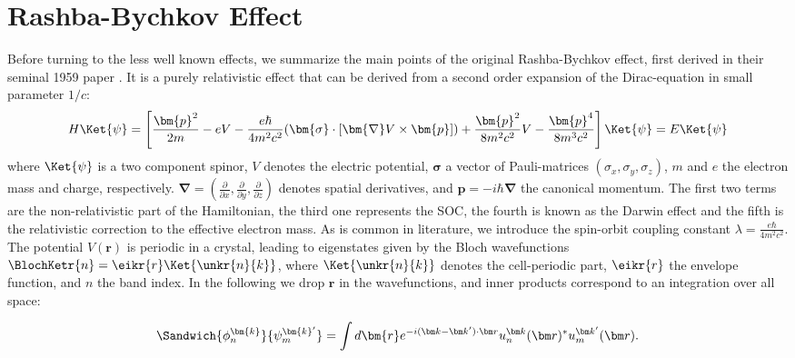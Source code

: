 \section{Rashba-Bychkov Effect \label{sec:Rashba_relativistic}}
Before turning to the less well known effects, we summarize the main points of the original Rashba-Bychkov effect, first derived in their seminal 1959 paper \cite{Rashba1959SymmetryAr}.
It is a purely relativistic effect that can be derived from a second order expansion of the Dirac-equation in small parameter $1/c$:
\begin{equation}
	\label{eq:Rashba_dirac}
	H \Ket{\psi} = \left[\frac{\bm{p}^2}{2m} - e V - \frac{e \hbar}{4m^2c^2}(\bm{\sigma}\cdot[\bm{\nabla}V \times \bm{p}]) + \frac{\bm{p}^2}{8m^2c^2} V - \frac{\bm{p}^4}{8m^3c^2}\right]\Ket{\psi} = E\Ket{\psi}
\end{equation}
where $\Ket{\psi}$ is a two component spinor, $V$ denotes the electric potential, $\bm{\sigma}$ a vector of Pauli-matrices $(\sigma_x, \sigma_y, \sigma_z)$, $m$ and $e$ the electron mass and charge, respectively.
$\bm \nabla = (\frac{\partial}{\partial x}, \frac{\partial}{\partial y}, \frac{\partial }{\partial z})$ denotes spatial derivatives, and $\bm{p} = -i\hbar \bm{\nabla}$ the canonical momentum.
The first two terms are the non-relativistic part of the Hamiltonian, the third one represents the SOC, the fourth is known as the Darwin effect and the fifth is the relativistic correction to the effective electron mass. 
As is common in literature, we introduce the spin-orbit coupling constant $\lambda = \frac{e \hbar}{4m^2c^2}$.
The potential $V(\bm r)$ is periodic in a crystal, leading to eigenstates given by the Bloch wavefunctions $\BlochKetr{n} = \eikr{r} \Ket{\unkr{n}{k}}$, where $\Ket{\unkr{n}{k}}$ denotes the cell-periodic part, $\eikr{r}$ the envelope function, and $n$ the band index.
In the following we drop $\bm{r}$ in the wavefunctions, and inner products correspond to an integration over all space:

\begin{equation}
	\Sandwich{\phi_n^{\bm{k}}}{\psi_m^{\bm{k}'}} = \int d\bm{r} e^{-i (\bm k - \bm k') \cdot \bm r} u_n^{\bm k }(\bm r)^* u_m^{\bm k'}(\bm r).
\end{equation}

